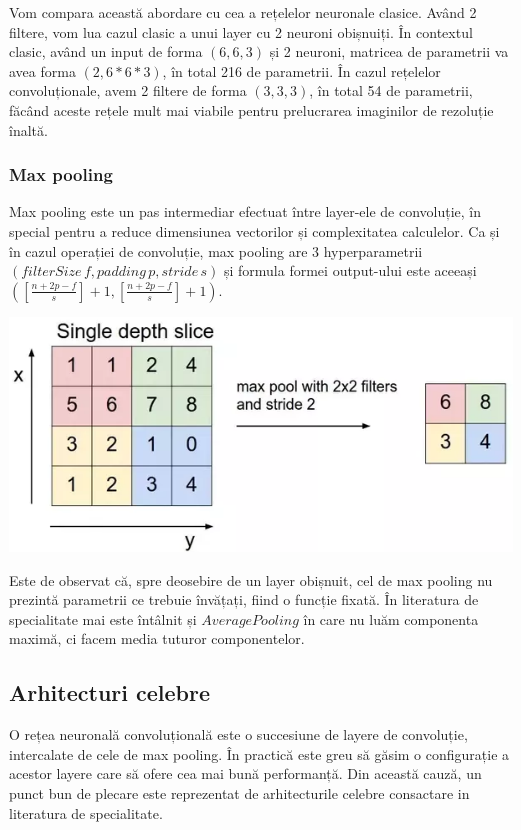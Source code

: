 Vom compara această abordare cu cea a rețelelor neuronale clasice. Având 2 filtere, vom lua cazul clasic a unui layer cu 2 neuroni obișnuiți. În contextul clasic, având un input de forma $(6,6,3)$ și 2 neuroni, matricea de parametrii va avea forma $(2,6*6*3)$, în total 216 de parametrii. În cazul rețelelor convoluționale, avem 2 filtere de forma $(3,3,3)$, în total 54 de parametrii, făcând aceste rețele mult mai viabile pentru prelucrarea imaginilor de rezoluție înaltă.

\subsubsection{Max pooling}
Max pooling este un pas intermediar efectuat între layer-ele de convoluție, în special pentru a reduce dimensiunea vectorilor și complexitatea calculelor. Ca și în cazul operației de convoluție, max pooling are 3 hyperparametrii $(filterSize \, f, padding \, p ,stride \, s)$ și formula formei output-ului este aceeași $\displaystyle{\left(\displaystyle{\left[\frac{n+2p-f}{s}\right]}+1, \displaystyle{\left[\frac{n+2p-f}{s}\right]}+1\right)}$.
 
\begin{center}
\includegraphics[scale=0.5]{maxPooling}
\end{center}

Este de observat că, spre deosebire de un layer obișnuit, cel de max pooling nu prezintă parametrii ce trebuie învățați, fiind o funcție fixată. În literatura de specialitate mai este întâlnit și $Average Pooling$ în care nu luăm componenta maximă, ci facem media tuturor componentelor.

\subsection{Arhitecturi celebre}
O rețea neuronală convoluțională este o succesiune de layere de convoluție, intercalate de cele de max pooling. În practică este greu să găsim o configurație a acestor layere care să ofere cea mai bună performanță. Din această cauză, un punct bun de plecare este reprezentat de arhitecturile celebre consactare in literatura de specialitate.

